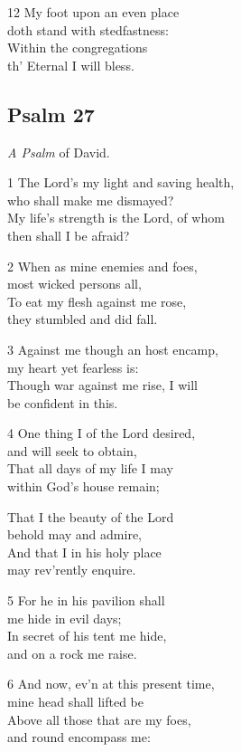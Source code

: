 12 My foot upon an even place\\
doth stand with stedfastness:\\
Within the congregations\\
th’ Eternal I will bless.

\begin{center}
\quad{}\quad{}
\end{center}

\subsection*{Psalm 27 }

\emph{A Psalm} of David.

1 The Lord’s my light and saving health,\\
who shall make me dismayed?\\
My life’s strength is the Lord, of whom\\
then shall I be afraid?

2 When as mine enemies and foes,\\
most wicked persons all,\\
To eat my flesh against me rose,\\
they stumbled and did fall.

3 Against me though an host encamp,\\
my heart yet fearless is:\\
Though war against me rise, I will\\
be confident in this.

4 One thing I of the Lord desired,\\
and will seek to obtain,\\
That all days of my life I may\\
within God’s house remain;

That I the beauty of the Lord\\
behold may and admire,\\
And that I in his holy place\\
may rev’rently enquire.

5 For he in his pavilion shall\\
me hide in evil days;\\
In secret of his tent me hide,\\
and on a rock me raise.

6 And now, ev’n at this present time,\\
mine head shall lifted be\\
Above all those that are my foes,\\
and round encompass me:

